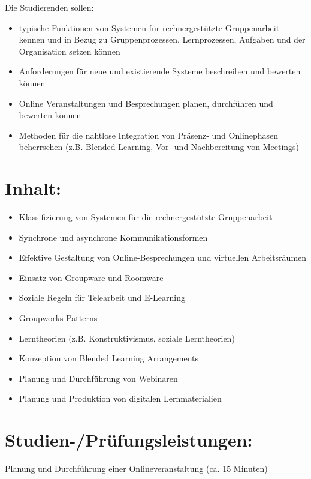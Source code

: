 Die Studierenden sollen:

\begin{itemize}
\tightlist
\item
  typische Funktionen von Systemen für rechnergestützte Gruppenarbeit
  kennen und in Bezug zu Gruppenprozessen, Lernprozessen, Aufgaben und
  der Organisation setzen können
\item
  Anforderungen für neue und existierende Systeme beschreiben und
  bewerten können
\item
  Online Veranstaltungen und Besprechungen planen, durchführen und
  bewerten können
\item
  Methoden für die nahtlose Integration von Präsenz- und Onlinephasen
  beherrschen (z.B. Blended Learning, Vor- und Nachbereitung von
  Meetings)
\end{itemize}

\section*{Inhalt:}\label{inhalt-13}

\begin{itemize}
\tightlist
\item
  Klassifizierung von Systemen für die rechnergestützte Gruppenarbeit
\item
  Synchrone und asynchrone Kommunikationsformen
\item
  Effektive Gestaltung von Online-Besprechungen und virtuellen
  Arbeitsräumen
\item
  Einsatz von Groupware und Roomware
\item
  Soziale Regeln für Telearbeit und E-Learning
\item
  Groupworks Patterns
\item
  Lerntheorien (z.B. Konstruktivismus, soziale Lerntheorien)
\item
  Konzeption von Blended Learning Arrangements
\item
  Planung und Durchführung von Webinaren
\item
  Planung und Produktion von digitalen Lernmaterialien
\end{itemize}

\section*{Studien-/Prüfungsleistungen:}\label{studien-pruxfcfungsleistungen-13}

Planung und Durchführung einer Onlineveranstaltung (ca. 15 Minuten)

